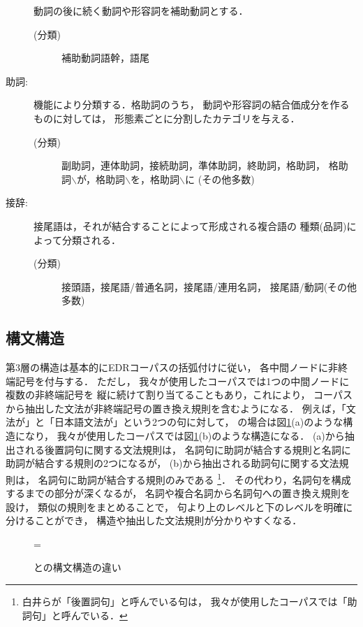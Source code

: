 \begin{description}
  動詞の後に続く動詞や形容詞を補助動詞とする．
  \begin{description}
  \item[(分類)] 補助動詞語幹，語尾
  \end{description}
\item[助詞: ] 機能により分類する．格助詞のうち，
  動詞や形容詞の結合価成分を作るものに対しては，
  形態素ごとに分割したカテゴリを与える．
  \begin{description}
  \item[(分類)] 副助詞，連体助詞，接続助詞，準体助詞，終助詞，格助詞，
    格助詞$\backslash$が，格助詞$\backslash$を，格助詞$\backslash$に
    (その他多数)
  \end{description}
\item[接辞: ] 接尾語は，それが結合することによって形成される複合語の
  種類(品詞)によって分類される．
  \begin{description}
  \item[(分類)] 接頭語，接尾語/普通名詞，接尾語/連用名詞，
    接尾語/動詞(その他多数)
  \end{description}
\end{description}
\fi

\subsection{構文構造}

第3層の構造は基本的にEDRコーパスの括弧付けに従い，
各中間ノードに非終端記号を付与する．
ただし，
我々が使用したコーパスでは1つの中間ノードに複数の非終端記号を
縦に続けて割り当てることもあり，これにより，
コーパスから抽出した文法が非終端記号の置き換え規則を含むようになる．
例えば，「文法が」と「日本語文法が」という2つの句に対して，
\cite{shirai:97}の場合は図\ref{fig:labelling}(a)のような構造になり，
我々が使用したコーパスでは図\ref{fig:labelling}(b)のような構造になる．
(a)から抽出される後置詞句に関する文法規則は，
名詞句に助詞が結合する規則と名詞に助詞が結合する規則の2つになるが，
(b)から抽出される助詞句に関する文法規則は，
名詞句に助詞が結合する規則のみである
\footnote{白井らが「後置詞句」と呼んでいる句は，
我々が使用したコーパスでは「助詞句」と呼んでいる．}．
その代わり，名詞句を構成するまでの部分が深くなるが，
名詞や複合名詞から名詞句への置き換え規則を設け，
類似の規則をまとめることで，
句より上のレベルと下のレベルを明確に分けることができ，
構造や抽出した文法規則が分かりやすくなる．

\begin{figure}[tp]
  \centering
  \epsfxsize=\textwidth
  \caption{\protect\cite{shirai:97}との構文構造の違い}
  \label{fig:labelling}
\end{figure}


